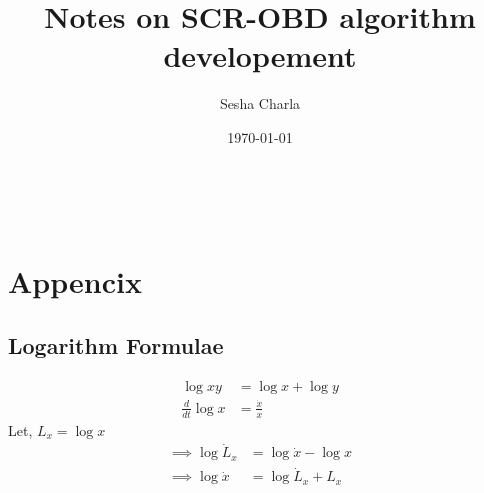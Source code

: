 \documentclass[letterpaper, 11pt]{article}
\title{Notes on SCR-OBD algorithm developement}
\author{Sesha Charla}
\date{\today}
\begin{document}
\maketitle
\tableofcontents
\newpage
\
\newpage

\newpage

\newpage

\newpage

\newpage

\newpage

\newpage
\section{Appencix}
\subsection{Logarithm Formulae}
\begin{align*}
    \log xy &= \log x + \log y\\
    \frac{d}{dt} \log x &= \frac{\dot x}{x}
\end{align*}
Let, $L_x = \log x$
\begin{align*}
    \implies \log \dot L_x &= \log \dot x - \log x\\
    \implies \log \dot x &= \log \dot L_x  + L_x
\end{align*}


\newpage
\nocite{}


\end{document}
